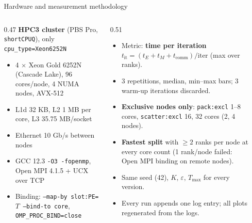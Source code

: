 \documentclass[aspectratio=169,10pt]{beamer}
\begin{document}
\begin{frame}{Hardware and measurement methodology}
\begin{columns}[T]
\begin{column}{0.47\textwidth}
\footnotesize
\textbf{HPC3 cluster} (PBS Pro, \texttt{shortCPUQ}), only \texttt{cpu\_type=Xeon6252N}
\begin{itemize}
\item 4 $\times$ Xeon Gold 6252N (Cascade Lake), 96 cores/node, 4 NUMA nodes, AVX-512
\item L1d 32 KB, L2 1 MB per core, L3 35.75 MB/socket
\item Ethernet 10 Gb/s between nodes
\item GCC 12.3 \texttt{-O3 -fopenmp}, Open MPI 4.1.5 + UCX over TCP
\item Binding: \texttt{--map-by slot:PE=$T$ --bind-to core}, \texttt{OMP\_PROC\_BIND=close}
\end{itemize}
\end{column}
\begin{column}{0.51\textwidth}
\footnotesize
\begin{itemize}
\item Metric: \textbf{time per iteration} $t_{\mathrm{it}}=(t_E+t_M+t_{\mathrm{comm}})/\text{iter}$ (max over ranks).
\item 3 repetitions, median, min--max bars; 3 warm-up iterations discarded.
\item \textbf{Exclusive nodes only}: \texttt{pack:excl} 1--8 cores, \texttt{scatter:excl} 16, 32 cores (2, 4 nodes).
\item \textbf{Fastest split} with $\ge 2$ ranks per node at every core count (1 rank/node failed: Open MPI binding on remote nodes).
\item Same seed (42), $K$, $\varepsilon$, $T_{\max}$ for every version.
\item Every run appends one log entry; all plots regenerated from the logs.
\end{itemize}
\end{column}
\end{columns}
\end{frame}
\end{document}
